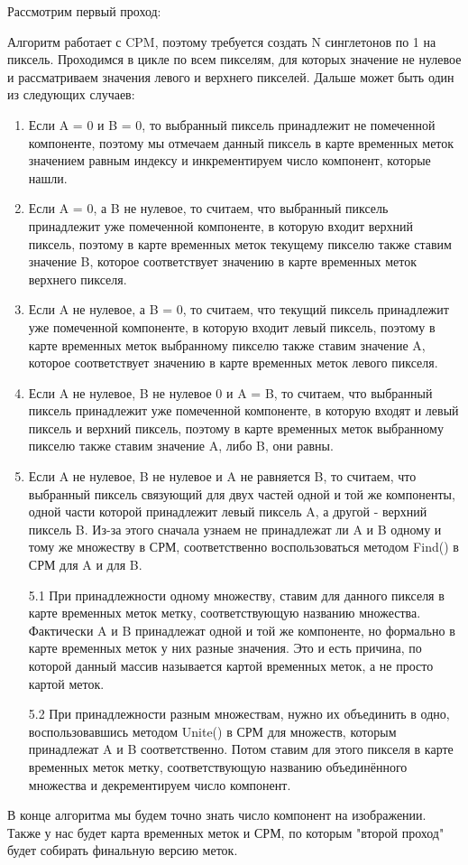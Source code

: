 \documentclass{report}
\begin{document}
			 \item Рассмотрим первый проход:
			
				\item Алгоритм работает с CPM, поэтому требуется создать N синглетонов по 1 на пиксель. Проходимся в цикле по всем пикселям, для которых значение не нулевое и рассматриваем значения левого и верхнего пикселей. Дальше может быть один из следующих случаев:
				\begin{enumerate}
					\item Если A = 0 и B = 0, то выбранный пиксель принадлежит не помеченной компоненте, поэтому мы отмечаем данный пиксель в карте временных меток значением равным индексу и инкрементируем число компонент, которые нашли.
					\item Если A = 0, а B не нулевое, то считаем, что выбранный пиксель принадлежит уже помеченной компоненте, в которую входит верхний пиксель, поэтому в карте временных меток текущему пикселю также ставим значение B, которое соответствует значению в карте временных меток верхнего пикселя.
					\item Если A не нулевое, а B = 0, то считаем, что текущий пиксель принадлежит уже помеченной компоненте, в которую входит левый пиксель, поэтому в карте временных меток выбранному пикселю также ставим значение A, которое соответствует значению в карте временных меток левого пикселя.
					\item Если A не нулевое, B не нулевое 0 и A = B, то считаем, что выбранный пиксель принадлежит уже помеченной компоненте, в которую входят и левый пиксель и верхний пиксель, поэтому в карте временных меток выбранному пикселю также ставим значение A, либо B, они равны.
					\item Если A не нулевое, B не нулевое и A не равняется B, то считаем, что выбранный пиксель связующий для двух частей одной и той же компоненты, одной части которой принадлежит левый пиксель A, а другой - верхний пиксель B. Из-за этого сначала узнаем не принадлежат ли A и B одному и тому же множеству в СРМ, соответственно воспользоваться методом Find() в СРМ для A и для B. 
					\par5.1 При принадлежности одному множеству, ставим для данного пикселя в карте временных меток метку, соответствующую названию множества. Фактически A и B принадлежат одной и той же компоненте, но формально в карте временных меток у них разные значения. Это и есть причина, по которой данный массив называется картой временных меток, а не просто картой меток.
					\par5.2 При принадлежности разным множествам, нужно их объединить в одно, воспользовавшись методом Unite() в СРМ для множеств, которым принадлежат A и B соответственно. Потом ставим для этого пикселя в карте временных меток метку, соответствующую названию объединённого множества и декрементируем число компонент.
				\end{enumerate}
				\item В конце алгоритма мы будем точно знать число компонент на изображении. Также у нас будет карта временных меток и СРМ, по которым "второй проход"{} будет собирать финальную версию меток.
	
\end{document}
